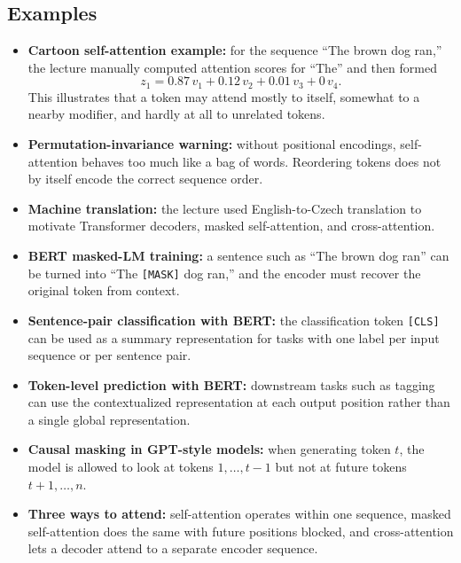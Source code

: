 \documentclass[11pt]{article}
\begin{document}
\subsection{Examples}
\begin{itemize}
    \item \textbf{Cartoon self-attention example:} for the sequence ``The brown dog ran,'' the lecture manually computed attention scores for ``The'' and then formed
    \[
    z_1 = 0.87\,v_1 + 0.12\,v_2 + 0.01\,v_3 + 0\,v_4.
    \]
    This illustrates that a token may attend mostly to itself, somewhat to a nearby modifier, and hardly at all to unrelated tokens.
    \item \textbf{Permutation-invariance warning:} without positional encodings, self-attention behaves too much like a bag of words. Reordering tokens does not by itself encode the correct sequence order.
    \item \textbf{Machine translation:} the lecture used English-to-Czech translation to motivate Transformer decoders, masked self-attention, and cross-attention.
    \item \textbf{BERT masked-LM training:} a sentence such as ``The brown dog ran'' can be turned into ``The \texttt{[MASK]} dog ran,'' and the encoder must recover the original token from context.
    \item \textbf{Sentence-pair classification with BERT:} the classification token \texttt{[CLS]} can be used as a summary representation for tasks with one label per input sequence or per sentence pair.
    \item \textbf{Token-level prediction with BERT:} downstream tasks such as tagging can use the contextualized representation at each output position rather than a single global representation.
    \item \textbf{Causal masking in GPT-style models:} when generating token \(t\), the model is allowed to look at tokens \(1,\dots,t-1\) but not at future tokens \(t+1,\dots,n\).
    \item \textbf{Three ways to attend:} self-attention operates within one sequence, masked self-attention does the same with future positions blocked, and cross-attention lets a decoder attend to a separate encoder sequence.
\end{itemize}
\end{document}
